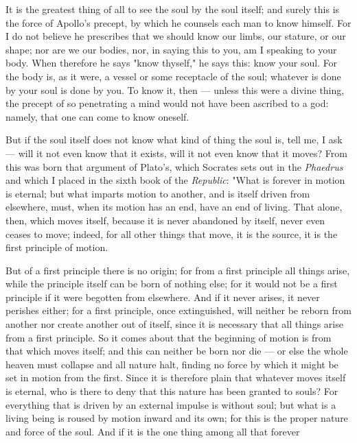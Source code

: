  It is the greatest thing of all to see the soul by the soul itself; and surely this is the force of Apollo's precept, by which he counsels each man to know himself. For I do not believe he prescribes that we should know our limbs, our stature, or our shape; nor are we our bodies, nor, in saying this to you, am I speaking to your body. When therefore he says "know thyself," he says this: know your soul. For the body is, as it were, a vessel or some receptacle of the soul; whatever is done by your soul is done by you. To know it, then — unless this were a divine thing, the precept of so penetrating a mind would not have been ascribed to a god: namely, that one can come to know oneself.

 But if the soul itself does not know what kind of thing the soul is, tell me, I ask — will it not even know that it exists, will it not even know that it moves? From this was born that argument of Plato's, which Socrates sets out in the \textit{Phaedrus} and which I placed in the sixth book of the \textit{Republic}: "What is forever in motion is eternal; but what imparts motion to another, and is itself driven from elsewhere, must, when its motion has an end, have an end of living. That alone, then, which moves itself, because it is never abandoned by itself, never even ceases to move; indeed, for all other things that move, it is the source, it is the first principle of motion.

 But of a first principle there is no origin; for from a first principle all things arise, while the principle itself can be born of nothing else; for it would not be a first principle if it were begotten from elsewhere. And if it never arises, it never perishes either; for a first principle, once extinguished, will neither be reborn from another nor create another out of itself, since it is necessary that all things arise from a first principle. So it comes about that the beginning of motion is from that which moves itself; and this can neither be born nor die — or else the whole heaven must collapse and all nature halt, finding no force by which it might be set in motion from the first. Since it is therefore plain that whatever moves itself is eternal, who is there to deny that this nature has been granted to souls? For everything that is driven by an external impulse is without soul; but what is a living being is roused by motion inward and its own; for this is the proper nature and force of the soul. And if it is the one thing among all that forever

